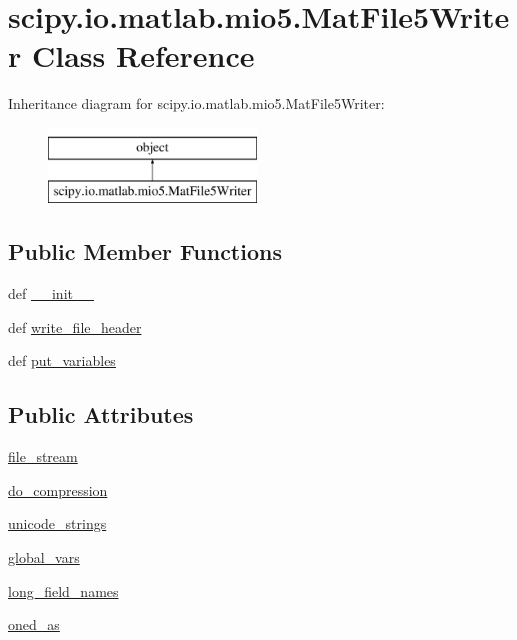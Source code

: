 \hypertarget{classscipy_1_1io_1_1matlab_1_1mio5_1_1MatFile5Writer}{}\section{scipy.\+io.\+matlab.\+mio5.\+Mat\+File5\+Writer Class Reference}
\label{classscipy_1_1io_1_1matlab_1_1mio5_1_1MatFile5Writer}
Inheritance diagram for scipy.\+io.\+matlab.\+mio5.\+Mat\+File5\+Writer\+:\begin{figure}[H]
\begin{center}
\leavevmode
\includegraphics[height=2.000000cm]{classscipy_1_1io_1_1matlab_1_1mio5_1_1MatFile5Writer}
\end{center}
\end{figure}
\subsection*{Public Member Functions}
\begin{DoxyCompactItemize}
\item 
def \hyperlink{classscipy_1_1io_1_1matlab_1_1mio5_1_1MatFile5Writer_ad0374352ac9260913bcb7f19c9b6cfa1}{\+\_\+\+\_\+init\+\_\+\+\_\+}
\item 
def \hyperlink{classscipy_1_1io_1_1matlab_1_1mio5_1_1MatFile5Writer_ae380b695b930909ce6321a4d9b68bb75}{write\+\_\+file\+\_\+header}
\item 
def \hyperlink{classscipy_1_1io_1_1matlab_1_1mio5_1_1MatFile5Writer_ab3563e53e9c6172e109146bf18dfb603}{put\+\_\+variables}
\end{DoxyCompactItemize}
\subsection*{Public Attributes}
\begin{DoxyCompactItemize}
\item 
\hyperlink{classscipy_1_1io_1_1matlab_1_1mio5_1_1MatFile5Writer_a939709c53b1a65913374994125e1a6e8}{file\+\_\+stream}
\item 
\hyperlink{classscipy_1_1io_1_1matlab_1_1mio5_1_1MatFile5Writer_a3dcdab9f951755d4ec3bedd1e576a117}{do\+\_\+compression}
\item 
\hyperlink{classscipy_1_1io_1_1matlab_1_1mio5_1_1MatFile5Writer_af9974a90073d52efd5fc08a535b976d9}{unicode\+\_\+strings}
\item 
\hyperlink{classscipy_1_1io_1_1matlab_1_1mio5_1_1MatFile5Writer_a7f2aa1dff12b1739a9ae59f65b9f9bd1}{global\+\_\+vars}
\item 
\hyperlink{classscipy_1_1io_1_1matlab_1_1mio5_1_1MatFile5Writer_a8628ac038fd576a6b30ea524b5b6f752}{long\+\_\+field\+\_\+names}
\item 
\hyperlink{classscipy_1_1io_1_1matlab_1_1mio5_1_1MatFile5Writer_abe758153347093df0054b93bb1f8559c}{oned\+\_\+as}
\end{DoxyCompactItemize}


